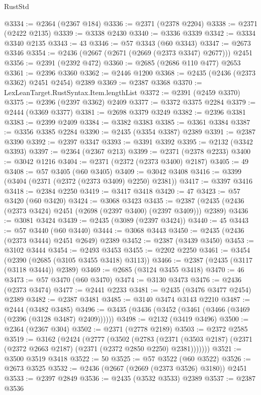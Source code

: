 \begin{lexlean}{RustStd}
\begin{coremodule}
@3334 := @2364 (@2367 @184)
@3336 := @2371 (@2378 @2204)
@3338 := @2371 (@2422 @2135)
@3339 := @3338 @2430
@3340 := @3336 @3339
@3342 := @3334 @3340 @2135
@3343 := 43
@3346 := @57 @3343 (@60 @3343)
@3347 := @2673 @3346
@3354 := @2436 (@2667 (@2671 (@2669 (@2373 @3347) @2677))) @2451
@3356 := @2391 (@2392 @472)
@3360 := @2685 (@2686 @110 @477) @2653
@3361 := @2396 @3360
@3362 := @2446 @1200
@3368 := @2435 (@2436 (@2373 @3362) @2451 @2454) @2389
@3369 := @2387 @3368
@3370 := LexLeanTarget.RustSyntax.Item.lengthList
@3372 := @2391 (@2459 @3370)
@3375 := @2396 (@2397 @3362) @2409
@3377 := @3372 @3375 @2284
@3379 := @2444 (@3369 @3377)
@3381 := @2698 @3379 @3249
@3382 := @2396 @3381
@3383 := @2399 @2409
@3384 := @3382 @3383
@3385 := @3361 @3384
@3387 := @3356 @3385 @2284
@3390 := @2435 (@3354 @3387) @2389
@3391 := @2387 @3390
@3392 := @2397 @3347
@3393 := @3391 @3392
@3395 := @2132 (@3342 @3393)
@3397 := @2364 (@2367 @213)
@3399 := @2371 (@2378 @2233)
@3400 := @3042 @1216
@3404 := @2371 (@2372 (@2373 @3400) @2187)
@3405 := 49
@3408 := @57 @3405 (@60 @3405)
@3409 := @3042 @3408
@3416 := @3399 (@3404 (@2371 (@2372 (@2373 @3409) @2250) @2381))
@3417 := @3397 @3416
@3418 := @2384 @2250
@3419 := @3417 @3418
@3420 := 47
@3423 := @57 @3420 (@60 @3420)
@3424 := @3068 @3423
@3435 := @2387 (@2435 (@2436 (@2373 @3424) @2451 (@2698 (@2397 @3400) (@2397 @3409))) @2389)
@3436 := @3081 @3424
@3439 := @2435 (@3089 (@2397 @3424))
@3440 := 45
@3443 := @57 @3440 (@60 @3440)
@3444 := @3068 @3443
@3450 := @2435 (@2436 (@2373 @3444) @2451 @2649) @2389
@3452 := @2387 (@3439 @3450)
@3453 := @3102 @3444
@3454 := @2493 @3453
@3455 := @2202 @2250
@3461 := @3454 (@2390 (@2685 (@3105 @3455 @3418) @3113))
@3466 := @2387 (@2435 (@3117 (@3118 @3444)) @2389)
@3469 := @2685 (@3124 @3455 @3418)
@3470 := 46
@3473 := @57 @3470 (@60 @3470)
@3474 := @3130 @3473
@3476 := @2436 (@2373 @3474)
@3477 := @2441 @2233
@3481 := @2435 (@3476 @3477 @2454) @2389
@3482 := @2387 @3481
@3485 := @3140 @3474 @3143 @2210
@3487 := @2444 (@3482 @3485)
@3496 := @3435 (@3436 (@3452 (@3461 (@3466 (@3469 (@2396 (@3128 @3487) @2409))))))
@3498 := @2132 (@3419 @3496)
@3500 := @2364 (@2367 @304)
@3502 := @2371 (@2778 @2189)
@3503 := @2372 @2585
@3519 := @3162
    (@2424
      (@2777
        (@3502
          (@2783
            (@2371 (@3503 @2187) (@2371 (@2372 @2663 @2187) (@2371 (@2372 @2850 @2250) @2381)))))))
@3521 := @3500 @3519 @3418
@3522 := 50
@3525 := @57 @3522 (@60 @3522)
@3526 := @2673 @3525
@3532 := @2436 (@2667 (@2669 (@2373 @3526) @3180)) @2451
@3533 := @2397 @2849
@3536 := @2435 (@3532 @3533) @2389
@3537 := @2387 @3536

\end{coremodule}
\end{lexlean}
